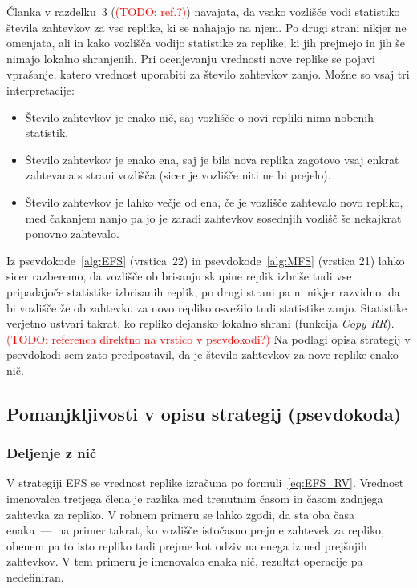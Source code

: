 \documentclass[a4paper, 12pt]{book}
\newcommand{\TODO}[1]{\textcolor{red}{(TODO: #1)}}
\begin{document}
Članka v razdelku~3 (\TODO{ref.?}) navajata, da vsako vozlišče vodi statistiko
števila zahtevkov za vse replike, ki se nahajajo na njem. Po drugi strani
nikjer ne omenjata, ali in kako vozlišča vodijo statistike za replike, ki jih
prejmejo in jih še nimajo lokalno shranjenih.
Pri ocenjevanju vrednosti nove replike se pojavi vprašanje, katero vrednost
uporabiti za število zahtevkov zanjo. Možne so vsaj tri interpretacije:

\begin{itemize}
\item Število zahtevkov je enako nič, saj vozlišče o novi repliki nima nobenih
statistik.
\item Število zahtevkov je enako ena, saj je bila nova replika zagotovo vsaj
enkrat zahtevana s strani vozlišča (sicer je vozlišče niti ne bi prejelo).
\item Število zahtevkov je lahko večje od ena, če je vozlišče zahtevalo novo
repliko, med čakanjem nanjo pa jo je zaradi zahtevkov sosednjih vozlišč
še nekajkrat ponovno zahtevalo.
\end{itemize}

Iz psevdokode~\ref{alg:EFS} (vrstica~22) in psevdokode~\ref{alg:MFS} (vrstica 21)
lahko sicer razberemo, da vozlišče ob brisanju skupine replik izbriše tudi vse
pripadajoče statistike izbrisanih replik, po drugi strani pa ni nikjer razvidno,
da bi vozlišče že ob zahtevku za novo repliko osvežilo tudi statistike zanjo.
Statistike verjetno ustvari takrat, ko repliko dejansko lokalno shrani
(funkcija \textit{Copy RR}). \TODO{referenca direktno na vrstico v psevdokodi?}
Na podlagi opisa strategij v psevdokodi sem zato predpostavil, da je število
zahtevkov za nove replike enako nič.


\subsection{Pomanjkljivosti v opisu strategij (psevdokoda)}

\subsubsection{Deljenje z nič}

V strategiji EFS se vrednost replike izračuna po formuli~\eqref{eq:EFS_RV}.
Vrednost imenovalca tretjega člena je razlika med trenutnim časom in časom
zadnjega zahtevka za repliko. V robnem primeru se lahko zgodi, da sta oba časa
enaka~---~na primer takrat, ko vozlišče istočasno prejme zahtevek za repliko,
obenem pa to isto repliko tudi prejme kot odziv na enega izmed prejšnjih
zahtevkov. V tem primeru je imenovalca enaka nič, rezultat operacije pa
nedefiniran.
\end{document}
